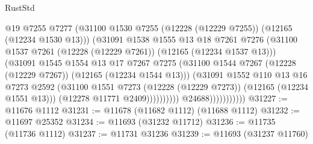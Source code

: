 \begin{lexlean}{RustStd}
\begin{coremodule}
                                      @19
                                      @7255
                                      @7277
                                      (@31100
                                        @1530
                                        @7255
                                        (@12228 (@12229 @7255))
                                        (@12165 (@12234 @1530 @13)))
                                      (@31091
                                        @1538
                                        @1555
                                        @13
                                        @18
                                        @7261
                                        @7276
                                        (@31100
                                          @1537
                                          @7261
                                          (@12228 (@12229 @7261))
                                          (@12165 (@12234 @1537 @13)))
                                        (@31091
                                          @1545
                                          @1554
                                          @13
                                          @17
                                          @7267
                                          @7275
                                          (@31100
                                            @1544
                                            @7267
                                            (@12228 (@12229 @7267))
                                            (@12165 (@12234 @1544 @13)))
                                          (@31091
                                            @1552
                                            @110
                                            @13
                                            @16
                                            @7273
                                            @2592
                                            (@31100
                                              @1551
                                              @7273
                                              (@12228 (@12229 @7273))
                                              (@12165 (@12234 @1551 @13)))
                                            (@12278 @11771 @2409))))))))))
                          @24688)))))))))))
@31227 := @11676 @1112
@31231 := @11678 (@11682 @1112) (@11688 @1112)
@31232 := @11697 @25352
@31234 := @11693 (@31232 @11712)
@31236 := @11735 (@11736 @1112)
@31237 := @11731 @31236
@31239 := @11693 (@31237 @11760)

\end{coremodule}
\end{lexlean}
